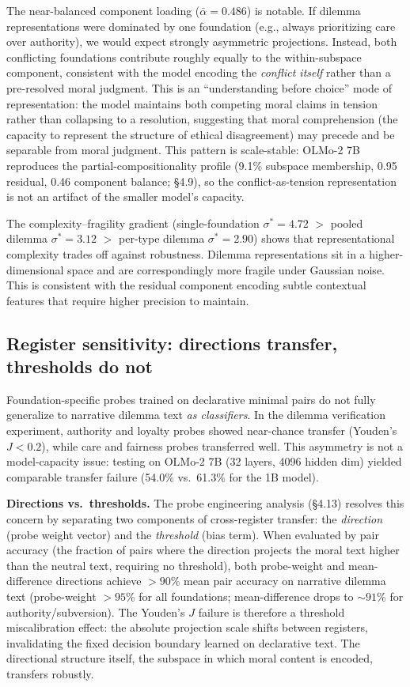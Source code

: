 The near-balanced component loading (\(\bar{\alpha} = 0.486\)) is
notable. If dilemma representations were dominated by one
foundation (e.g., always prioritizing care over authority), we
would expect strongly asymmetric projections. Instead, both
conflicting foundations contribute roughly equally to the
within-subspace component, consistent with the model encoding the
\emph{conflict itself} rather than a pre-resolved moral judgment. This
is an ``understanding before choice'' mode of representation: the
model maintains both competing moral claims in tension rather than
collapsing to a resolution, suggesting that moral comprehension
(the capacity to represent the structure of ethical disagreement)
may precede and be separable from moral judgment. This pattern is
scale-stable: OLMo-2 7B reproduces the partial-compositionality
profile (9.1\% subspace membership, 0.95 residual, 0.46 component
balance; \S4.9), so the conflict-as-tension representation is not an
artifact of the smaller model's capacity.

The complexity--fragility gradient (single-foundation
\(\sigma^* = 4.72\) \(>\) pooled dilemma \(\sigma^* = 3.12\) \(>\)
per-type dilemma \(\sigma^* = 2.90\)) shows that representational
complexity trades off against robustness. Dilemma representations
sit in a higher-dimensional space and are correspondingly more
fragile under Gaussian noise. This is consistent with the
residual component encoding subtle contextual features that
require higher precision to maintain.

\subsection{Register sensitivity: directions transfer, thresholds do not}\label{register-sensitivity-directions-transfer-thresholds-do-not}

Foundation-specific probes trained on declarative minimal pairs do
not fully generalize to narrative dilemma text \emph{as classifiers}. In
the dilemma verification experiment, authority and loyalty probes
showed near-chance transfer (Youden's \(J < 0.2\)), while care and
fairness probes transferred well. This asymmetry is not a
model-capacity issue: testing on OLMo-2 7B (32 layers, 4096 hidden
dim) yielded comparable transfer failure (54.0\% vs.~61.3\% for
the 1B model).

\textbf{Directions vs.~thresholds.} The probe engineering analysis
(\S4.13) resolves this concern by separating two components of
cross-register transfer: the \emph{direction} (probe weight vector) and
the \emph{threshold} (bias term). When evaluated by pair accuracy (the
fraction of pairs where the direction projects the moral text higher
than the neutral text, requiring no threshold), both probe-weight
and mean-difference directions achieve \(>90\)\% mean pair accuracy on
narrative dilemma text (probe-weight \(>95\)\% for all foundations;
mean-difference drops to \({\sim}91\)\% for authority/subversion).
The Youden's \(J\) failure is therefore a threshold
miscalibration effect: the absolute projection scale shifts between
registers, invalidating the fixed decision boundary learned on
declarative text. The directional structure itself, the
subspace in which moral content is encoded, transfers robustly.


